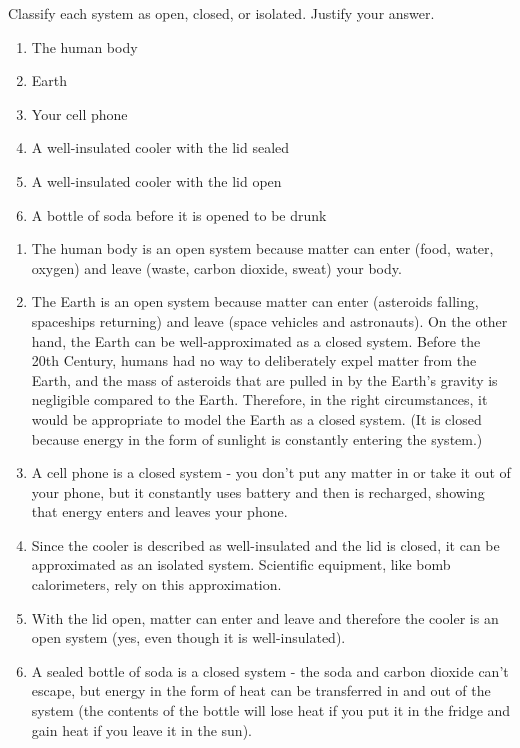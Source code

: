 \begin{Exercise}[title = {Open, Closed, and Isolated Systems}, label = systems]
Classify each system as open, closed, or isolated. Justify your answer. 
\begin{enumerate}
\item The human body
\item Earth
\item Your cell phone
\item A well-insulated cooler with the lid sealed
\item A well-insulated cooler with the lid open
\item A bottle of soda before it is opened to be drunk
\end{enumerate}
\end{Exercise}

\begin{Answer}[ref = systems]
\begin{enumerate}
\item The human body is an open system because matter can enter (food, water, 
oxygen) and leave (waste, carbon dioxide, sweat) your body.
\item The Earth is an open system because matter can enter (asteroids falling, 
spaceships returning) and leave (space vehicles and astronauts). On the other 
hand, the Earth can be well-approximated as a closed system. Before the 20th 
Century, humans had no way to deliberately expel matter from the Earth, and the 
mass of asteroids that are pulled in by the Earth's gravity is negligible 
compared to the Earth. Therefore, in the right circumstances, it would be 
appropriate to model the Earth as a closed system. (It is closed because 
energy in the form of sunlight is constantly entering the system.)
\item A cell phone is a closed system - you don't put any matter in or take it 
out of your phone, but it constantly uses battery and then is recharged, showing
that energy enters and leaves your phone. 
\item Since the cooler is described as well-insulated and the lid is closed, it 
can be approximated as an isolated system. Scientific equipment, like bomb 
calorimeters, rely on this approximation. 
\item With the lid open, matter can enter and leave and therefore the cooler is 
an open system (yes, even though it is well-insulated). 
\item A sealed bottle of soda is a closed system - the soda and carbon dioxide 
can't escape, but energy in the form of heat can be transferred in and out of 
the system (the contents of the bottle will lose heat if you put it in the 
fridge and gain heat if you leave it in the sun).
\end{enumerate}
\end{Answer}
